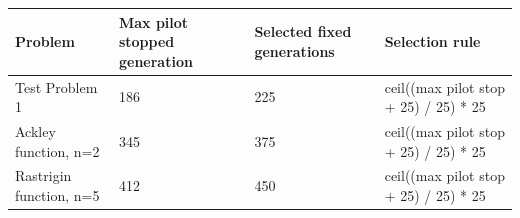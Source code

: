 \begin{tabular}{llll}
\hline
Problem & Max pilot stopped generation & Selected fixed generations & Selection rule \\
\hline
Test Problem 1 & 186 & 225 & ceil((max pilot stop + 25) / 25) * 25 \\
Ackley function, n=2 & 345 & 375 & ceil((max pilot stop + 25) / 25) * 25 \\
Rastrigin function, n=5 & 412 & 450 & ceil((max pilot stop + 25) / 25) * 25 \\
\hline
\end{tabular}
